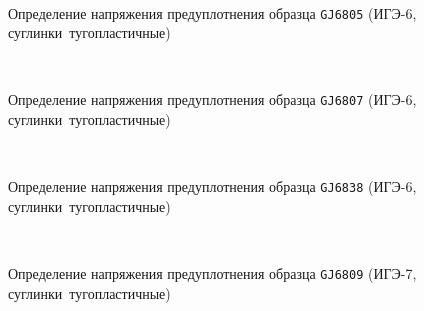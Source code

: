 \begin{figure}[h!]
    {\centering
      \def\svgwidth{11cm} %
      \small
      \hfill 
      \\
      \hfill  
      \def\svgwidth{11cm}
      \hfill 
      }
      \caption{Определение напряжения предуплотнения образца \texttt{GJ6805} (ИГЭ-6, суглинки тугопластичные)}
      \label{img:6805}
    \end{figure}
    
    \begin{figure}
        {\centering
        \small
          \hfill 
          \\
          \hfill  
          \hfill 
          }
          \caption{Определение напряжения предуплотнения образца \texttt{GJ6807} (ИГЭ-6, суглинки тугопластичные)}
          \label{img:6807}
    \end{figure}
    
    \begin{figure}
        {\centering
        \small
            \hfill 
            \\
            \hfill  
            \hfill 
            }
            \caption{Определение напряжения предуплотнения образца \texttt{GJ6838} (ИГЭ-6, суглинки тугопластичные)}
            \label{img:6838}
    \end{figure}
    
    
    \begin{figure}
        {\centering
        \small
            \hfill 
            \\
            \hfill  
            \hfill 
            }
            \caption{Определение напряжения предуплотнения образца \texttt{GJ6809} (ИГЭ-7, суглинки тугопластичные)}
            \label{img:6809}
    \end{figure}
    
